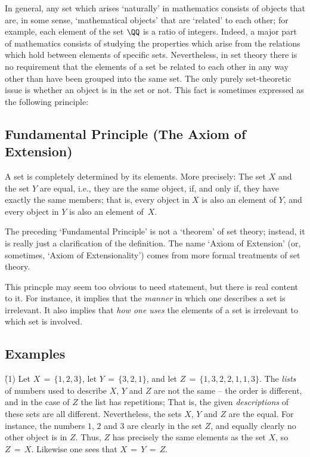 \VV


        In general, any set which arises `naturally' in mathematics consists of objects that are, in some sense,
    `mathematical objects' that are `related' to each other; for example, each element of the set ${\QQ}$ is a ratio of integers.
    Indeed, a major part of mathematics consists of studying the properties which arise from the relations which hold between elements of specific sets.
    Nevertheless, in set theory there is no requirement that the elements of a set be related to each other in any way other than have been grouped into the same set.
    The only purely set-theoretic issue is whether an object is in the set or not. This fact is sometimes expressed as the following principle:

\V

            \subsection{\small{\bf Fundamental Principle (The Axiom of Extension)}}
            \label{PrinA10.08}

        A set is completely determined by its elements. More precisely: The set $X$ and the set $Y$ are equal,
    i.e., they are the same object, if, and only if, they have exactly the same members;
    that is, every object in $X$ is also an element of $Y$, and every object in $Y$ is also an element of~$X$.

\V

        The preceding `Fundamental Principle' is not a `theorem' of set theory; instead, it is really just a clarification of the definition.
    The name `Axiom of Extension' (or, sometimes, `Axiom of Extensionality') comes from more formal treatments of set theory.

        This princple may seem too obvious to need statement, but there is real content to it.
    For instance, it implies that the {\em manner} in which one describes a set is irrelevant.
    It also implies that {\em how one uses} the elements of a set is irrelevant to which set is involved.

            \subsection{\small{\bf Examples}}
            \label{ExampA10.09}


         \h (1) Let $X \,=\, \{1,2,3\}$, let $Y \,=\, \{3,2,1\}$, and let $Z \,=\, \{1,3,2,2,1,1,3\}$.
    The {\em lists} of numbers used to describe $X$, $Y$ and $Z$ are not the same -- the order is different, and in the case of $Z$ the list has repetitions;
    That is, the given {\em descriptions} of these sets are all different.
    Nevertheless, the sets $X$, $Y$ and $Z$ are the equal.
    For instance, the numbers $1$, $2$ and $3$ are clearly in the set $Z$, and equally clearly no other object is in $Z$.
    Thus, $Z$ has precisely the same elements as the set $X$, so $Z \,=\, X$. Likewise one sees that $X \,=\, Y \,=\, Z$.

